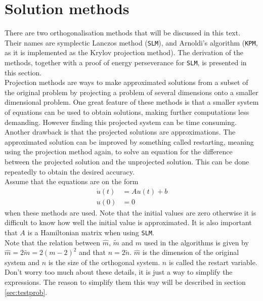 \section{Solution methods} \label{sec:solmet} %
\label{sec:KPM}
\noindent There are two orthogonalisation methods that will be discussed in this text. Their names are symplectic Lanczos method (\texttt{SLM}), and Arnoldi's algorithm (\texttt{KPM}, as it is implemented as the Krylov projection method). The derivation of the methods, together with a proof of energy perseverance for \texttt{SLM}, is presented in this section. \\


\noindent Projection methods are ways to make approximated solutions from a subset of the original problem by projecting a problem of several dimensions onto a smaller dimensional problem. One great feature of these methods is that a smaller system of equations can be used to obtain solutions, making further computations less demanding. However finding this projected system can be time consuming. Another drawback is that the projected solutions are approximations. The approximated solution can be improved by something called restarting, meaning using the projection method again, to solve an equation for the difference between the projected solution and the unprojected solution. This can be done repeatedly to obtain the desired accuracy. \\

\noindent Assume that the equations are on the form
\begin{equation}
\begin{aligned}
\dot{u}(t) &= Au(t) + b \\
u(0) &= 0
\end{aligned}
\label{eqn:PMform}
\end{equation}
\noindent when these methods are used. Note that the initial values are zero otherwise it is difficult to know how well the initial value is approximated. It is also important that $A$ is a Hamiltonian matrix when using \texttt{SLM}. \\

\noindent Note that the relation between $\hat{m}$, $\tilde{m}$ and $m$ used in the algorithms is given by $\hat{m} = 2\tilde{m}= 2(m-2)^2$ and that $ n = 2\tilde{n}$. $\hat{m}$ is the dimension of the original system and $n$ is the size of the orthogonal system. $n$ is called the restart variable. Don't worry too much about these details, it is just a way to simplify the expressions. The reason to simplify them this way will be described in section \ref{sec:testprob}. \\

